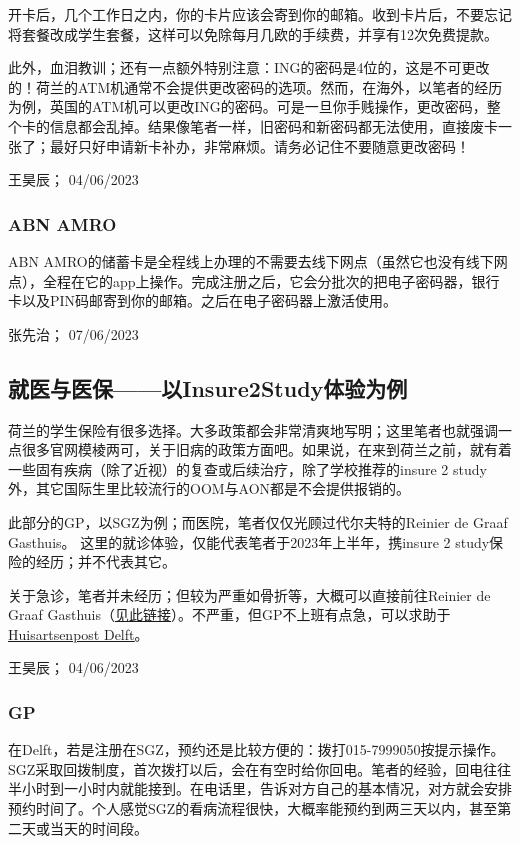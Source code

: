 开卡后，几个工作日之内，你的卡片应该会寄到你的邮箱。收到卡片后，不要忘记将套餐改成学生套餐，这样可以免除每月几欧的手续费，并享有12次免费提款。

此外，血泪教训；还有一点额外特别注意：ING的密码是4位的，这是不可更改的！荷兰的ATM机通常不会提供更改密码的选项。然而，在海外，以笔者的经历为例，英国的ATM机可以更改ING的密码。可是一旦你手贱操作，更改密码，整个卡的信息都会乱掉。结果像笔者一样，旧密码和新密码都无法使用，直接废卡一张了；最好只好申请新卡补办，非常麻烦。请务必记住不要随意更改密码！
\begin{flushright}
王昊辰； 04/06/2023
\end{flushright}
\subsubsection{ABN AMRO}
ABN AMRO的储蓄卡是全程线上办理的不需要去线下网点（虽然它也没有线下网点），全程在它的app上操作。完成注册之后，它会分批次的把电子密码器，银行卡以及PIN码邮寄到你的邮箱。之后在电子密码器上激活使用。
\begin{flushright}
张先治； 07/06/2023

\end{flushright}
\subsection{就医与医保——以Insure2Study体验为例}
荷兰的学生保险有很多选择。大多政策都会非常清爽地写明；这里笔者也就强调一点很多官网模棱两可，关于旧病的政策方面吧。如果说，在来到荷兰之前，就有着一些固有疾病（除了近视）的复查或后续治疗，除了学校推荐的insure 2 study外，其它国际生里比较流行的OOM与AON都是不会提供报销的。

此部分的GP，以SGZ为例；而医院，笔者仅仅光顾过代尔夫特的Reinier de Graaf Gasthuis。 这里的就诊体验，仅能代表笔者于2023年上半年，携insure 2 study保险的经历；并不代表其它。

关于急诊，笔者并未经历；但较为严重如骨折等，大概可以直接前往Reinier de Graaf Gasthuis（\href{https://reinierdegraaf.nl/specialisme/spoedeisende-hulp}{\uline{见此链接}}）。不严重，但GP不上班有点急，可以求助于\href{https://hapschievliet.nl/language/english/}{\uline{Huisartsenpost Delft}}。
\begin{flushright}
王昊辰； 04/06/2023
\end{flushright}

\subsubsection{GP}
在Delft，若是注册在SGZ，预约还是比较方便的：拨打015-7999050按提示操作。SGZ采取回拨制度，首次拨打以后，会在有空时给你回电。笔者的经验，回电往往半小时到一小时内就能接到。在电话里，告诉对方自己的基本情况，对方就会安排预约时间了。个人感觉SGZ的看病流程很快，大概率能预约到两三天以内，甚至第二天或当天的时间段。

